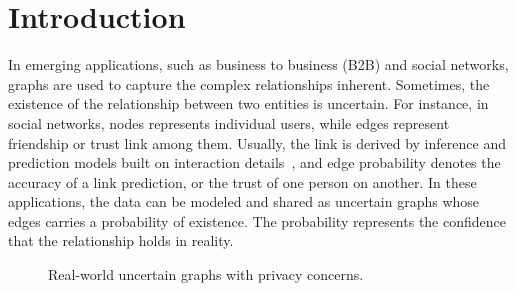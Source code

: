 \section{Introduction}

\label{sec:Intro}

In emerging applications, such as business to business (B2B) and social networks,  graphs are used to capture the complex relationships inherent. Sometimes, the existence of the relationship between two entities is uncertain. For instance, in social networks, nodes represents individual users, while edges represent friendship or trust link among them.  Usually, the link is derived by inference and prediction models built on interaction details~\cite{Lin_B2B,Adar_Managing_2007,Kempe_Maximizing_2003}, and edge probability denotes the accuracy of a link prediction, or the trust of one person on another. 
In these applications, the data can be modeled and shared as uncertain graphs whose edges carries a probability of existence. The probability represents the confidence that the relationship holds in reality. 

\begin{figure}[!htb]
  \vspace{-7pt}
    \vspace{-7pt}
    \caption{Real-world uncertain graphs with privacy concerns.}
    \label{fig:motivation}
    \vspace{-7pt}
\end{figure} 

